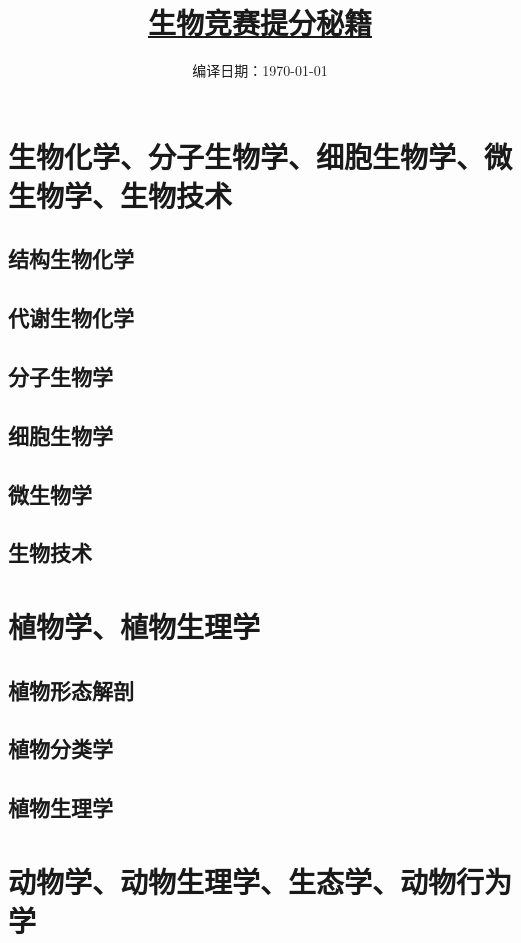 \documentclass[b5paper,zihao=-4]{ctexbook}
\title{\fontsize{40}{40} \hyperref[mulu]{\textbf{生物竞赛提分秘籍}}}
\date{编译日期：\today}
\author{}
\begin{document}
	\frontmatter
	\maketitle
	\tableofcontents
	\label{mulu}

	\mainmatter
	\part{生物化学、分子生物学、细胞生物学、微生物学、生物技术}
	\chapter{结构生物化学}
		
	\chapter{代谢生物化学}
		
	\chapter{分子生物学}
		
	\chapter{细胞生物学}
		
	\chapter{微生物学}
		
	\chapter{生物技术}
		

	\part{植物学、植物生理学}
	\chapter{植物形态解剖}
		
	\chapter{植物分类学}
		
	\chapter{植物生理学}
		
	\part{动物学、动物生理学、生态学、动物行为学}
\end{document}
